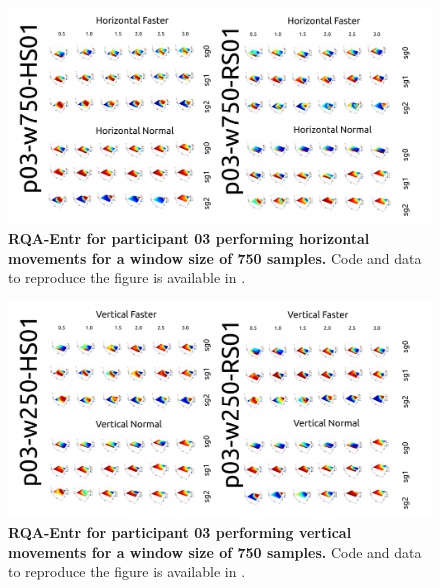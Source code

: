 \documentclass[12pt]{article}
\begin{document}
\newpage
\begin{figure}[ht!]
\centering
\includegraphics{figures/rqa/output/epsilons/rqa-epsilonsp03w750Horizontal}
    	\caption{
	{\bf RQA-Entr for participant 03 performing horizontal movements for a window size of 750 samples.}
	Code and data to reproduce the figure is available in \cite{srep2021}.
        }
    \label{fig-p03-H-w750}
\end{figure}
\begin{figure}[hb!]
\centering
\includegraphics{figures/rqa/output/epsilons/rqa-epsilonsp03w750Vertical}
    	\caption{
	{\bf RQA-Entr for participant 03 performing vertical movements for a window size of 750 samples.}
	Code and data to reproduce the figure is available in \cite{srep2021}.
        }
    \label{fig-p03-V-w750}
\end{figure}
\end{document}
